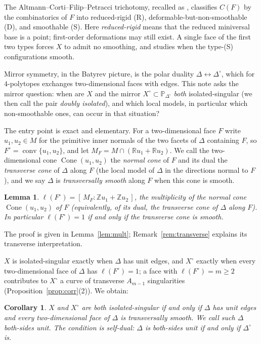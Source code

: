 \documentclass[11pt]{amsart}
\newtheorem{lemma}[theorem]{Lemma}
\newtheorem{corollary}[theorem]{Corollary}
\theoremstyle{definition}
\theoremstyle{remark}
\newcommand{\ZZ}{\mathbb{Z}}
\newcommand{\RR}{\mathbb{R}}
\newcommand{\PP}{\mathbb{P}}
\newcommand{\MM}{M}
\newcommand{\conv}{\operatorname{conv}}
\newcommand{\Cone}{\operatorname{Cone}}
\begin{document}
The Altmann--Corti--Filip--Petracci trichotomy, recalled as \cite[Thm.~2.2]{paper1},
classifies $C(F)$ by the combinatorics of $F$ into reduced-rigid
\textup{(R)}, deformable-but-non-smoothable \textup{(D)}, and smoothable
\textup{(S)}.  Here \emph{reduced-rigid} means that the reduced miniversal
base is a point; first-order deformations may still exist.  A single face of the first two types forces $X$ to admit no smoothing, and
\cite{paper2} studies when the type-\textup{(S)} configurations smooth.

Mirror symmetry, in the Batyrev picture, is the polar duality
$\Delta \leftrightarrow \Delta^\circ$, which for $4$-polytopes exchanges
two-dimensional faces with edges.  This note asks the mirror question: when
are $X$ and the mirror $X^\circ \subset \PP_{\Delta^\circ}$ \emph{both}
isolated-singular (we then call the pair \emph{doubly isolated}), and
which local models, in particular which
non-smoothable ones, can occur in that situation?

The entry point is exact and elementary.  For a two-dimensional face $F$
write $u_1, u_2 \in \MM$ for the primitive inner normals of the two facets of
$\Delta$ containing $F$, so $F^\circ = \conv\{u_1,u_2\}$, and let
$\MM_F = \MM \cap (\RR u_1 + \RR u_2)$.  We call the two-dimensional cone
$\Cone(u_1,u_2)$ the \emph{normal cone} of $F$ and its dual the
\emph{transverse cone} of $\Delta$ along $F$ (the local model of
$\Delta$ in the directions normal to $F$), and we say $\Delta$ is
\emph{transversally smooth} along $F$ when this cone is smooth.

\begin{lemma}\label{thm:intromult}
$\ell(F^\circ) = [\,\MM_F : \ZZ u_1 + \ZZ u_2\,]$, the multiplicity of the
normal cone $\Cone(u_1,u_2)$ of $F$ (equivalently, of its dual, the
transverse cone of $\Delta$ along $F$).  In particular $\ell(F^\circ)=1$ if
and only if the transverse cone is smooth.
\end{lemma}

The proof is given in Lemma~\ref{lem:mult};
Remark~\ref{rem:transverse} explains its transverse interpretation.

$X$ is isolated-singular exactly when $\Delta$ has unit edges, and
$X^\circ$ exactly when every two-dimensional face of $\Delta$ has
$\ell(F^\circ)=1$; a face with $\ell(F^\circ) = m \ge 2$ contributes to
$X^\circ$ a curve of transverse $A_{m-1}$ singularities
(Proposition~\ref{prop:corr}(2)).  We obtain:

\begin{corollary}\label{cor:introboth}
$X$ and $X^\circ$ are both isolated-singular if and only if $\Delta$ has unit
edges and every two-dimensional face of $\Delta$ is transversally smooth.  We
call such $\Delta$ \emph{both-sides unit}.  The condition is self-dual:
$\Delta$ is both-sides unit if and only if $\Delta^\circ$ is.
\end{corollary}
\end{document}
